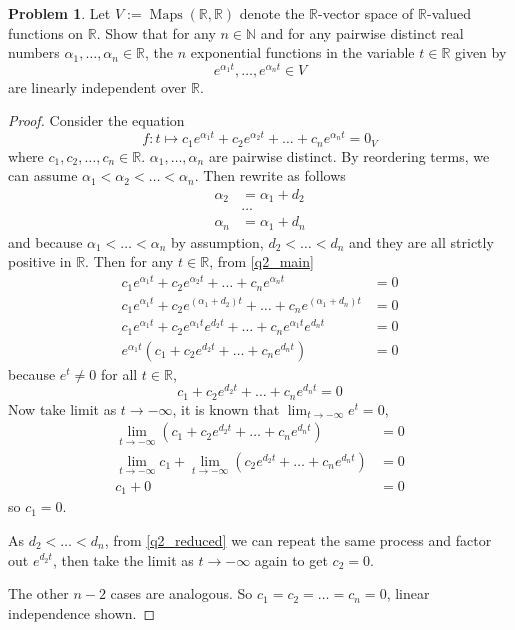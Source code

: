 \documentclass[11pt]{article}
\theoremstyle{definition}
\newtheorem{problem}{Problem}
\numberwithin{lemma}{problem}
\numberwithin{equation}{problem}
\newcommand{\N}{\mathbb{N}}
\newcommand{\R}{\mathbb{R}}
\DeclareMathOperator{\Maps}{Maps}
\begin{document}
\newpage
\begin{problem}
    Let $V := \Maps(\R, \R)$ denote the $\R$-vector space of $\R$-valued functions on $\R$.
    Show that for any $n\in \N$ and for any pairwise distinct real numbers
    $\alpha_1,\dots,\alpha_n \in \R$, the $n$ exponential functions in the variable
    $t \in \R$ given by
    $$e^{\alpha_1 t}, \dots, e^{\alpha_n t} \in V$$
    are linearly independent over $\R$.
\end{problem}
\begin{proof}
    Consider the equation
    \begin{equation} \label{q2_main}
        f: t\mapsto c_1 e^{\alpha_1 t} + c_2 e^{\alpha_2 t} + \dots + c_n e^{\alpha_n t} = 0_V
    \end{equation}
    where $c_1, c_2, \dots, c_n \in \R$.
    $\alpha_1,\dots,\alpha_n$ are pairwise distinct.
    By reordering terms, we can assume $\alpha_1 < \alpha_2 < \dots < \alpha_n$.
    Then rewrite as follows
    \begin{align*}
        \alpha_2 &= \alpha_1 + d_2    \\
        &\dots  \\
        \alpha_n &= \alpha_1 + d_n
    \end{align*}
    and because $\alpha_1 < \dots < \alpha_n$ by assumption, $d_2< \dots< d_n$ and they are all strictly positive in $\R$.
    Then for any $t\in \R$, from \eqref{q2_main}
    \begin{align*}
        c_1 e^{\alpha_1 t} + c_2 e^{\alpha_2 t} + \dots + c_n e^{\alpha_n t} &= 0   \\
        c_1 e^{\alpha_1 t} + c_2 e^{(\alpha_1 + d_2) t} + \dots + c_n e^{(\alpha_1 + d_n) t} &= 0  \\
        c_1 e^{\alpha_1 t} + c_2 e^{\alpha_1t} e^{d_2t} + \dots + c_n e^{\alpha_1t} e^{d_n t} &= 0 \\
        e^{\alpha_1t} \left(
            c_1 + c_2 e^{d_2t} + \dots + c_n e^{d_n t}
        \right) &= 0
    \end{align*}
    because $e^t \ne 0$ for all $t\in \R$,
    \begin{equation}    \label{q2_reduced}
        c_1 + c_2 e^{d_2t} + \dots + c_n e^{d_n t} = 0
    \end{equation}
    Now take limit as $t\to -\infty$, it is known that $\lim_{t\to -\infty} e^t = 0$,
    \begin{align*}
        \lim_{t\to -\infty} \left( c_1 + c_2 e^{d_2t} + \dots + c_n e^{d_n t} \right)&= 0   \\
        \lim_{t\to -\infty} c_1 + \lim_{t\to -\infty} \left( c_2 e^{d_2t} + \dots + c_n e^{d_n t} \right)&= 0   \\
        c_1 + 0 &= 0
    \end{align*}
    so $c_1 = 0$.

    As $d_2 < \dots < d_n$, from \eqref{q2_reduced} we can repeat the same process and
    factor out $e^{d_2 t}$, then take the limit as $t\to -\infty$ again to get $c_2 = 0$.

    The other $n-2$ cases are analogous. So $c_1 = c_2 = \dots = c_n = 0$, linear independence shown.
\end{proof}
\end{document}
